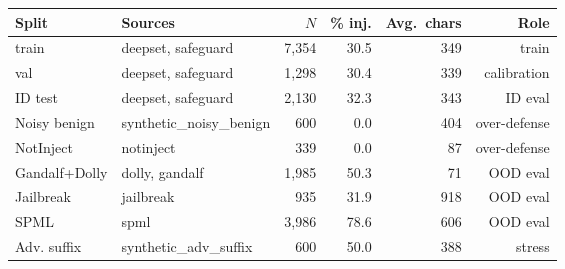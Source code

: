 \begin{tabular}{llrrrr}
\toprule
Split & Sources & $N$ & \% inj. & Avg.\ chars & Role \\
\midrule
train & \footnotesize deepset, safeguard & 7,354 & 30.5 & 349 & train \\
val & \footnotesize deepset, safeguard & 1,298 & 30.4 & 339 & calibration \\
ID test & \footnotesize deepset, safeguard & 2,130 & 32.3 & 343 & ID eval \\
Noisy benign & \footnotesize synthetic\_noisy\_benign & 600 & 0.0 & 404 & over-defense \\
NotInject & \footnotesize notinject & 339 & 0.0 & 87 & over-defense \\
Gandalf+Dolly & \footnotesize dolly, gandalf & 1,985 & 50.3 & 71 & OOD eval \\
Jailbreak & \footnotesize jailbreak & 935 & 31.9 & 918 & OOD eval \\
SPML & \footnotesize spml & 3,986 & 78.6 & 606 & OOD eval \\
Adv. suffix & \footnotesize synthetic\_adv\_suffix & 600 & 50.0 & 388 & stress \\
\bottomrule
\end{tabular}